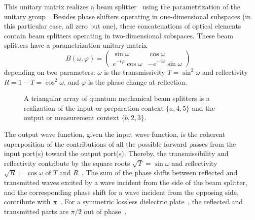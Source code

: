 \documentclass[%
 superscriptaddress,
  preprint,
 showpacs,
 showkeys,
 nofootinbib,
  amsmath,amssymb,
 pra,
  longbibliography,
  floatfix,
 ]{revtex4-2}
\theoremstyle{definition}
\begin{document}
This unitary matrix realizes  a beam splitter~\cite{reck-94,rzbb,%
de_Guise_2018}
using the parametrization of the unitary group~\cite{murnaghan}.
Besides phase shifters operating in one-dimensional subspaces (in this particular case, all zero but one),
these concatenations of optical elements
contain beam splitters operating in two-dimensional subspaces.
These beam splitters have a parametrization unitary matrix
\begin{equation*}
B( \omega , \varphi )  =
\begin{pmatrix}
 \sin  \omega  & \cos  \omega
\\
e^{-i \varphi } \cos  \omega  &-e^{-i \varphi } \sin  \omega
\end{pmatrix}
\end{equation*}
depending on two parameters:
 $\omega$ is the transmissivity $T=\sin^2\omega$ and reflectivity $R=1-T=\cos^2\omega$,
and $\varphi$ is the phase change at reflection.




\begin{figure}[ht]
\begin{center}
\end{center}
\caption{A triangular array of quantum mechanical beam splitters is a realization of the input or preparation context $\{a,4,5\}$ and the output or measurement context $\{b,2,3\}$.
\label{2023-viext-bsr}}
\end{figure}



The output wave function, given the input wave function,
is the coherent superposition of the contributions of all the possible forward passes from the input port(s) toward the output port(s).
Thereby, the transmissibility and reflectivity contribute by the square roots $\sqrt{T}=\sin \omega$
and reflectivity $\sqrt{R}=\cos \omega$ of $T$ and $R$~\cite{green-horn-zei}.
The sum of the phase shifts between reflected and transmitted waves
excited by a wave incident from the side of the beam splitter, and the corresponding phase shift
for a wave incident from the opposing side, contribute with $\pi$~\cite{zeilinger:882}.
For a symmetric lossless dielectric plate~\cite{Lai_1985},
the reflected and transmitted parts are $\pi/2$ out of phase~\cite{Degiorgio_1980,green-horn-zei}.
\end{document}
